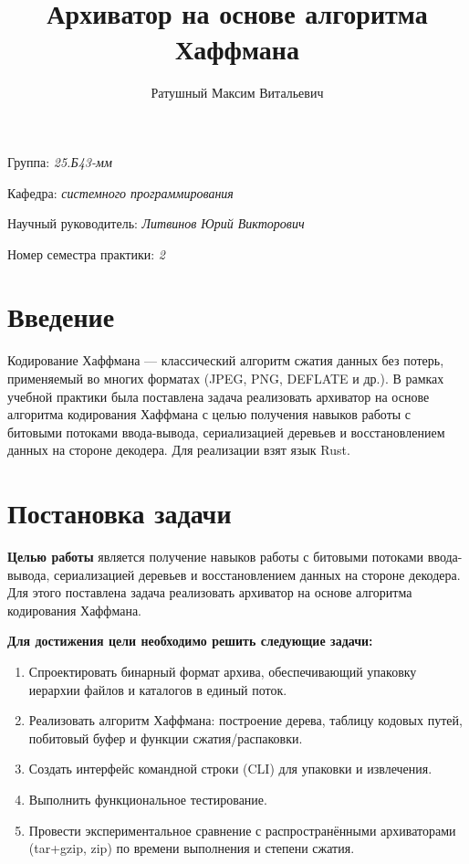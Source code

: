 \documentclass[a4paper]{article}
\title{Архиватор на основе алгоритма Хаффмана}
\author{Ратушный Максим Витальевич}
\date{}
\begin{document}
\maketitle

\begin{flushright}
    Группа: \emph{25.Б43-мм}

    Кафедра: \emph{системного программирования}

    Научный руководитель: \emph{Литвинов Юрий Викторович}

    Номер семестра практики: \emph{2}
\end{flushright}

\section{Введение}

Кодирование Хаффмана — классический алгоритм сжатия данных без потерь, применяемый во многих форматах (JPEG, PNG, DEFLATE и др.). В рамках учебной практики была поставлена задача реализовать архиватор на основе алгоритма кодирования Хаффмана с целью получения навыков работы с битовыми потоками ввода-вывода, сериализацией деревьев и восстановлением данных на стороне декодера. Для реализации взят язык Rust.

\section{Постановка задачи}

\textbf{Целью работы} является получение навыков работы с битовыми потоками ввода-вывода, сериализацией деревьев и восстановлением данных на стороне декодера. Для этого поставлена задача реализовать архиватор на основе алгоритма кодирования Хаффмана.

\textbf{Для достижения цели необходимо решить следующие задачи:}
\begin{enumerate}
    \item Спроектировать бинарный формат архива, обеспечивающий упаковку иерархии файлов и каталогов в единый поток.
    \item Реализовать алгоритм Хаффмана: построение дерева, таблицу кодовых путей, побитовый буфер и функции сжатия/распаковки.
    \item Создать интерфейс командной строки (CLI) для упаковки и извлечения.
    \item Выполнить функциональное тестирование.
    \item Провести экспериментальное сравнение с распространёнными архиваторами (tar+gzip, zip) по времени выполнения и степени сжатия.
\end{enumerate}
\end{document}
